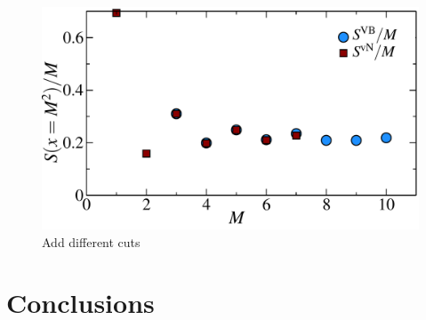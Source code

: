 \begin{figure} {
	\centering
	\includegraphics[width=5in]{./figures/made/marea.pdf} 
	\caption[fds]{ Add different cuts
	\label{2Dbetter}
	}
} \end{figure}


\section{Conclusions}
